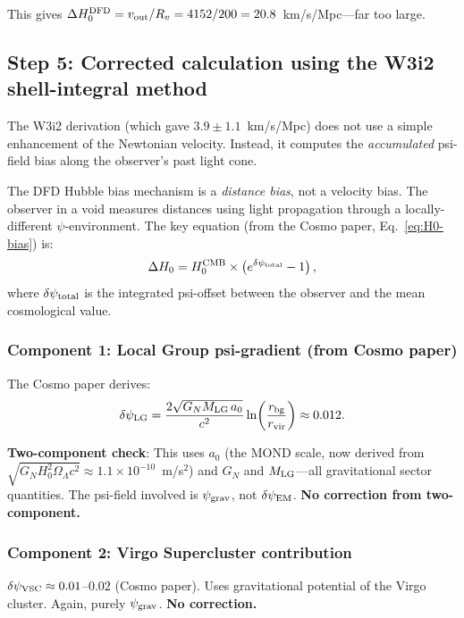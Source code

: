 \documentclass[11pt]{article}
\newcommand{\ee}[1]{\times 10^{#1}}
\newcommand{\psigrav}{\psi_{\rm grav}}
\newcommand{\dpsiEM}{\delta\psi_{\rm EM}}
\newcommand{\Hzero}{H_0}
\newcommand{\aM}{a_0}
\newcommand{\GN}{G_N}
\newcommand{\OmL}{\Omega_\Lambda}
\begin{document}
This gives $\Delta\Hzero^{\rm DFD} = v_{\rm out}/R_v = 4152/200
= 20.8$~km/s/Mpc---far too large.

\subsection{Step 5: Corrected calculation using the W3i2 shell-integral method}

The W3i2 derivation (which gave $3.9 \pm 1.1$~km/s/Mpc) does not
use a simple enhancement of the Newtonian velocity. Instead, it computes
the \emph{accumulated} psi-field bias along the observer's past light cone.

The DFD Hubble bias mechanism is a \emph{distance bias}, not a velocity
bias. The observer in a void measures distances using light propagation
through a locally-different $\psi$-environment. The key equation
(from the Cosmo paper, Eq.~\ref*{eq:H0-bias}) is:
\begin{equation}
\Delta\Hzero = \Hzero^{\rm CMB}\times\left(e^{\delta\psi_{\rm total}} - 1\right),
\label{eq:DeltaH0-psi}
\end{equation}
where $\delta\psi_{\rm total}$ is the integrated psi-offset between
the observer and the mean cosmological value.

\subsubsection{Component 1: Local Group psi-gradient (from Cosmo paper)}

The Cosmo paper derives:
\begin{equation}
\delta\psi_{\rm LG} = \frac{2\sqrt{\GN M_{\rm LG}\,\aM}}{c^2}
\ln\!\left(\frac{r_{\rm bg}}{r_{\rm vir}}\right)
\approx 0.012.
\end{equation}

\textbf{Two-component check}: This uses $\aM$ (the MOND scale, now
derived from $\sqrt{\GN\Hzero^2\OmL c^2} \approx 1.1\ee{-10}$~m/s$^2$)
and $\GN$ and $M_{\rm LG}$---all gravitational sector quantities.
The psi-field involved is $\psigrav$, not $\dpsiEM$.
\textbf{No correction from two-component.}

\subsubsection{Component 2: Virgo Supercluster contribution}

$\delta\psi_{\rm VSC} \approx 0.01$--$0.02$ (Cosmo paper).
Uses gravitational potential of the Virgo cluster. Again,
purely $\psigrav$. \textbf{No correction.}
\end{document}

